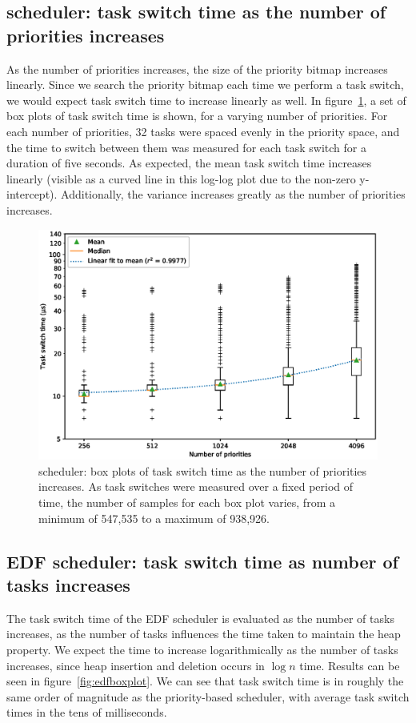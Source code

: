 \subsection{\ucosiii scheduler: task switch time as the number of priorities increases}
As the number of priorities increases, the size of the priority bitmap increases linearly. Since we search the priority bitmap each time we perform a task switch, we would expect task switch time to increase linearly as well. In figure~\ref{fig:prioboxplot}, a set of box plots of task switch time is shown, for a varying number of priorities. For each number of priorities, 32 tasks were spaced evenly in the priority space, and the time to switch between them was measured for each task switch for a duration of five seconds. As expected, the mean task switch time increases linearly (visible as a curved line in this log-log plot due to the non-zero y-intercept). Additionally, the variance increases greatly as the number of priorities increases.

\begin{figure}[htpb]
    \centering
    \includegraphics[width=\textwidth]{figures/boxplot.eps}
    \caption{\ucosiii scheduler: box plots of task switch time as the number of priorities increases. As task switches were measured over a fixed period of time, the number of samples for each box plot varies, from a minimum of 547,535 to a maximum of 938,926.}
    \label{fig:prioboxplot}
\end{figure}

\subsection{EDF scheduler: task switch time as number of tasks increases}
The task switch time of the EDF scheduler is evaluated as the number of tasks increases, as the number of tasks influences the time taken to maintain the heap property. We expect the time to increase logarithmically as the number of tasks increases, since heap insertion and deletion occurs in $\log n$ time. Results can be seen in figure~\ref{fig:edfboxplot}. We can see that task switch time is in roughly the same order of magnitude as the priority-based \ucosiii scheduler, with average task switch times in the tens of milliseconds.

